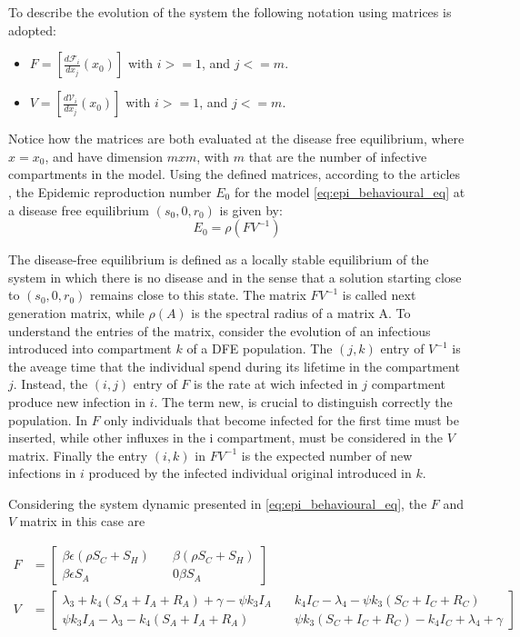 To describe the evolution of the system the following notation using matrices is adopted: 
\begin{itemize}
	\item $F = [\frac{d \mathcal{F}_i}{d x_j}(x_0)]$ with $i >= 1$, and $j <= m$.
	\item $V = [\frac{d \mathcal{V}_i}{d x_j}(x_0)]$ with $i >= 1$, and $j <= m$.	
\end{itemize} 
Notice how the matrices are both evaluated at the disease free equilibrium, where $x = x_0$, and have dimension $m x m$, with $m$ that are the number of infective compartments in the model. 
Using the defined matrices, according to the articles \cite{van_den_Driessche_2002,van_den_Driessche_2017}, the Epidemic reproduction number $E_0$ for the model \eqref{eq:epi_behavioural_eq} at a disease free equilibrium $(s_0, 0, r_0)$ is given by:
\begin{equation}
E_0 = \rho(FV^{-1})
\label{eq:R_0_eqn}
\end{equation}

The disease-free equilibrium is defined as a locally stable equilibrium of the system in which there is no disease and in the sense that a solution starting close to $(s_0, 0, r_0)$ remains close to this state. 
The matrix $FV^{-1}$ is called next generation matrix, while $\rho(A)$ is the spectral radius of a matrix A. To understand the entries of the matrix, consider the evolution of an infectious introduced into compartment $k$ of a DFE population. The $(j,k)$ entry of $V^{-1}$ is the aveage time that the individual spend during its lifetime in the compartment $j$. Instead, the $(i,j)$ entry of $F$ is the  rate at wich infected in $j$ compartment produce new infection in $i$. The term new, is crucial to distinguish correctly the population. In $F$ only individuals that become infected for the first time must be inserted, while other influxes in the i compartment, must be considered in the $V$ matrix. Finally the entry $(i,k)$  in $FV^{-1}$ is the expected number of new infections in  $i$ produced by the infected individual original introduced in $k$.

Considering the system dynamic presented in \eqref{eq:epi_behavioural_eq}, the $F$ and $V$ matrix in this case are

\begin{align}
F & = 
\begin{bmatrix}
	\beta \epsilon(\rho S_C + S_H) \quad & \beta(\rho S_C + S_H) \\
	\beta \epsilon S_A \quad& 0\beta S_A
\end{bmatrix} \\
V & = 
\begin{bmatrix}
	\lambda_3+k_4(S_A+I_A+R_A)+\gamma-\psi k_3 I_A \quad & k_4 I_C-\lambda_4-\psi k_3 (S_C+I_C + R_C)  \\
	\psi k_3 I_A - \lambda_3 - k_4 (S_A + I_A + R_A) \quad & \psi k_3 (S_C + I_C + R_C) - k_4 I_C + \lambda_4 + \gamma
\end{bmatrix}
\label{eq:next_gen_matrices}
\end{align}

